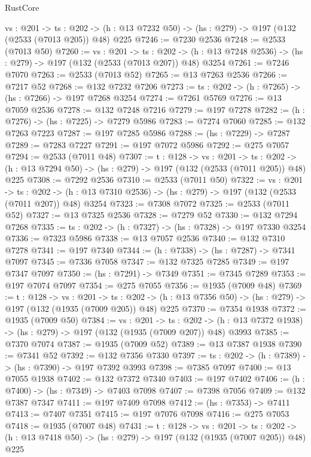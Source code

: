 \begin{lexlean}{RustCore}
\begin{coremodule}
  {vs : @201} ->
  {ts : @202} -> (h : @13 @7232 @50) -> (hs : @279) -> @197 (@132 (@2533 (@7013 @205)) @48) @225
@7246 := @7230 @2536
@7248 := @2533 (@7013 @50)
@7260 := {vs : @201} ->
  {ts : @202} -> (h : @13 @7248 @2536) -> (hs : @279) -> @197 (@132 (@2533 (@7013 @207)) @48) @3254
@7261 := @7246 @7070
@7263 := @2533 (@7013 @52)
@7265 := @13 @7263 @2536
@7266 := @7217 @52
@7268 := @132 @7232 @7206
@7273 := {ts : @202} -> (h : @7265) -> (hs : @7266) -> @197 @7268 @3254
@7274 := @7261 @5769
@7276 := @13 @7059 @2536
@7278 := @132 @7248 @7216
@7279 := @197 @7278
@7282 := (h : @7276) -> (hs : @7225) -> @7279 @5986
@7283 := @7274 @7060
@7285 := @132 @7263 @7223
@7287 := @197 @7285 @5986
@7288 := (hs : @7229) -> @7287
@7289 := @7283 @7227
@7291 := @197 @7072 @5986
@7292 := @275 @7057
@7294 := @2533 (@7011 @48)
@7307 := {t : @128} ->
  {vs : @201} ->
  {ts : @202} -> (h : @13 @7294 @50) -> (hs : @279) -> @197 (@132 (@2533 (@7011 @205)) @48) @225
@7308 := @7292 @2536
@7310 := @2533 (@7011 @50)
@7322 := {vs : @201} ->
  {ts : @202} -> (h : @13 @7310 @2536) -> (hs : @279) -> @197 (@132 (@2533 (@7011 @207)) @48) @3254
@7323 := @7308 @7072
@7325 := @2533 (@7011 @52)
@7327 := @13 @7325 @2536
@7328 := @7279 @52
@7330 := @132 @7294 @7268
@7335 := {ts : @202} -> (h : @7327) -> (hs : @7328) -> @197 @7330 @3254
@7336 := @7323 @5986
@7338 := @13 @7057 @2536
@7340 := @132 @7310 @7278
@7341 := @197 @7340
@7344 := (h : @7338) -> (hs : @7287) -> @7341 @7097
@7345 := @7336 @7058
@7347 := @132 @7325 @7285
@7349 := @197 @7347 @7097
@7350 := (hs : @7291) -> @7349
@7351 := @7345 @7289
@7353 := @197 @7074 @7097
@7354 := @275 @7055
@7356 := @1935 (@7009 @48)
@7369 := {t : @128} ->
  {vs : @201} ->
  {ts : @202} -> (h : @13 @7356 @50) -> (hs : @279) -> @197 (@132 (@1935 (@7009 @205)) @48) @225
@7370 := @7354 @1938
@7372 := @1935 (@7009 @50)
@7384 := {vs : @201} ->
  {ts : @202} -> (h : @13 @7372 @1938) -> (hs : @279) -> @197 (@132 (@1935 (@7009 @207)) @48) @3993
@7385 := @7370 @7074
@7387 := @1935 (@7009 @52)
@7389 := @13 @7387 @1938
@7390 := @7341 @52
@7392 := @132 @7356 @7330
@7397 := {ts : @202} -> (h : @7389) -> (hs : @7390) -> @197 @7392 @3993
@7398 := @7385 @7097
@7400 := @13 @7055 @1938
@7402 := @132 @7372 @7340
@7403 := @197 @7402
@7406 := (h : @7400) -> (hs : @7349) -> @7403 @7098
@7407 := @7398 @7056
@7409 := @132 @7387 @7347
@7411 := @197 @7409 @7098
@7412 := (hs : @7353) -> @7411
@7413 := @7407 @7351
@7415 := @197 @7076 @7098
@7416 := @275 @7053
@7418 := @1935 (@7007 @48)
@7431 := {t : @128} ->
  {vs : @201} ->
  {ts : @202} -> (h : @13 @7418 @50) -> (hs : @279) -> @197 (@132 (@1935 (@7007 @205)) @48) @225

\end{coremodule}
\end{lexlean}

